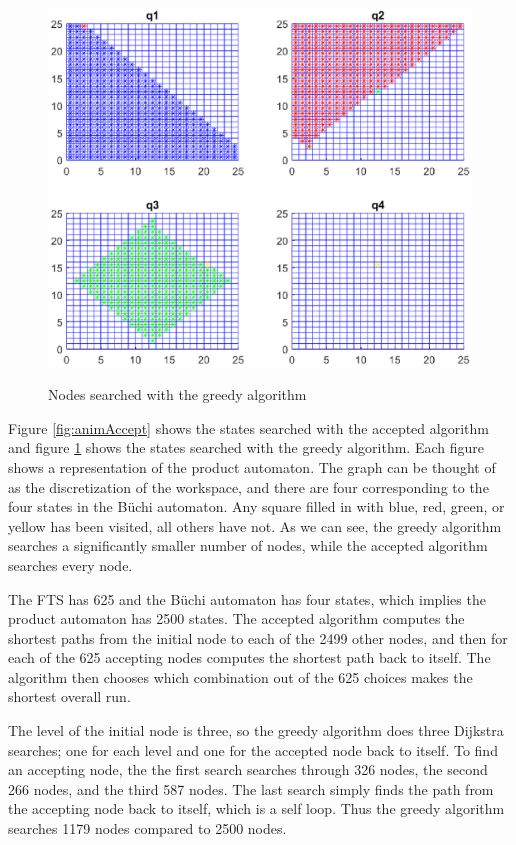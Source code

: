 \begin{figure}[!htb]
\centering
\includegraphics[scale=0.9]{ourPlot}
\label{fig:animOur}
\caption{Nodes searched with the greedy algorithm}
\end{figure}

Figure \ref{fig:animAccept} shows the states searched with the accepted algorithm and figure \ref{fig:animOur} shows the states searched with the greedy algorithm. Each figure shows a representation of the product automaton. The graph can be thought of as the discretization of the workspace, and there are four corresponding to the four states in the B\"uchi automaton. Any square filled in with blue, red, green, or yellow has been visited, all others have not. As we can see, the greedy algorithm searches a significantly smaller number of nodes, while the accepted algorithm searches every node.

The FTS has 625 and the B\"uchi automaton has four states, which implies the product automaton has 2500 states. The accepted algorithm computes the shortest paths from the initial node to each of the 2499 other nodes, and then for each of the 625 accepting nodes computes the shortest path back to itself. The algorithm then chooses which combination out of the 625 choices makes the shortest overall run. 

The level of the initial node is three, so the greedy algorithm does three Dijkstra searches; one for each level and one for the accepted node back to itself. To find an accepting node, the the first search searches through 326 nodes, the second 266 nodes, and the third 587 nodes. The last search simply finds the path from the accepting node back to itself, which is a self loop. Thus the greedy algorithm searches 1179 nodes compared to 2500 nodes.  



